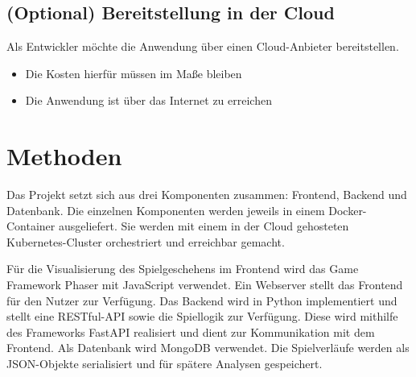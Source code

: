 \documentclass[a4paper, 10pt, conference]{IEEEtran}
\begin{document}
\subsection{(Optional) Bereitstellung in der Cloud}
Als Entwickler möchte die Anwendung über einen Cloud-Anbieter bereitstellen.
\begin{itemize}
	\item Die Kosten hierfür müssen im Maße bleiben
	\item Die Anwendung ist über das Internet zu erreichen
\end{itemize}

\section{Methoden}\label{sec:methoden}

Das Projekt setzt sich aus drei Komponenten zusammen: Frontend, Backend und Datenbank.
Die einzelnen Komponenten werden jeweils in einem Docker-Container ausgeliefert.
Sie werden mit einem in der Cloud gehosteten Kubernetes-Cluster orchestriert und erreichbar gemacht.

Für die Visualisierung des Spielgeschehens im Frontend wird das Game Framework Phaser mit JavaScript verwendet. 
Ein Webserver stellt das Frontend für den Nutzer zur Verfügung.
Das Backend wird in Python implementiert und stellt eine RESTful-API sowie die Spiellogik zur Verfügung.
Diese wird mithilfe des Frameworks FastAPI realisiert und dient zur Kommunikation mit dem Frontend.
Als Datenbank wird MongoDB verwendet. Die Spielverläufe werden als JSON-Objekte serialisiert und für spätere Analysen gespeichert.

\printbibliography
\end{document}
